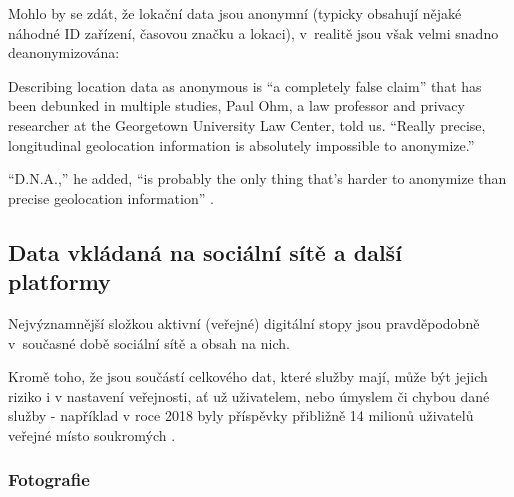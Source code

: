 Mohlo by se zdát, že lokační data jsou anonymní (typicky obsahují nějaké náhodné ID zařízení, časovou značku a lokaci), v~realitě jsou však velmi snadno deanonymizována:

\begin{displayquote}
Describing location data as anonymous is “a completely false claim” that has been debunked in multiple studies, Paul Ohm, a law professor and privacy researcher at the Georgetown University Law Center, told us. “Really precise, longitudinal geolocation information is absolutely impossible to anonymize.”

“D.N.A.,” he added, “is probably the only thing that’s harder to anonymize than precise geolocation information” \citep{location-data}.
\end{displayquote}

\subsection{Data vkládaná na sociální sítě a další platformy}
Nejvýznamnější složkou aktivní (veřejné) digitální stopy jsou pravděpodobně v~současné době sociální sítě a obsah na nich.

Kromě toho, že jsou součástí celkového  dat, které služby mají, může být jejich riziko i v nastavení veřejnosti, ať už uživatelem, nebo úmyslem či chybou dané služby - například v roce 2018 byly příspěvky přibližně 14 milionů uživatelů veřejné místo soukromých \citep{facebook-public-posts}.

\subsubsection{Fotografie}

